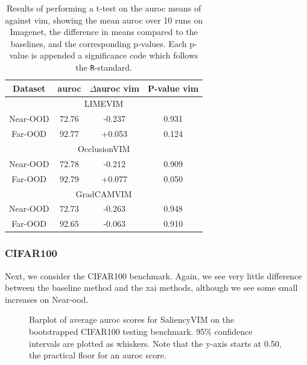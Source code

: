\documentclass[UKenglish]{uiomasterthesis} %
\theoremstyle{definition}
\begin{document}
\begin{table}[H]
\setlength\tabcolsep{3pt}
\begin{center}
\begin{tabular}{ |c|c|c|c| }
    \hline
    Dataset & \ac{auroc} & $\Delta$\ac{auroc} \ac{vim} & P-value \ac{vim} \\
    \hline
    \hline
    \multicolumn{4}{|c|}{LIMEVIM} \\
    \hline
    \rowcolor{near!50}
    Near-OOD & 72.76 & -0.237 & 0.931 \\
    \rowcolor{far!50}
    Far-OOD & 92.77 & +0.053 & 0.124 \\
    \hline
    \hline
    \multicolumn{4}{|c|}{OcclusionVIM} \\
    \hline
    \rowcolor{near!50}
    Near-OOD & 72.78 & -0.212 & 0.909 \\
    \rowcolor{far!50}
    Far-OOD & 92.79 & +0.077 & 0.050 \\
    \hline
    \hline
    \multicolumn{4}{|c|}{GradCAMVIM} \\
    \hline
    \rowcolor{near!50}
    Near-OOD & 72.73 & -0.263 & 0.948 \\
    \rowcolor{far!50}
    Far-OOD & 92.65 & -0.063 & 0.910 \\
    \hline
    \end{tabular}
    \caption[]{Results of performing a t-test on the \ac{auroc} means of against \ac{vim}, showing the mean \ac{auroc} over 10 runs on Imagenet, the difference in means compared to the baselines, and the corresponding p-values. Each p-value is appended a significance code which follows the \texttt{R}-standard.}
    \label{table:imagenet_salvim_ttest}
\end{center}
\setlength\tabcolsep{6pt}
\end{table}

\subsubsection{CIFAR100}

Next, we consider the CIFAR100 benchmark. Again, we see very little difference between the baseline method and the \ac{xai} methods, although we see some small increases on Near-\ac{ood}.

\begin{figure}[H]
    \begin{center}
        
    \end{center}
    \caption[CIFAR100 SaliencyVIM Bootstrap]{Barplot of average \ac{auroc} scores for SaliencyVIM on the bootstrapped CIFAR100 testing benchmark. 95\% confidence intervals are plotted as whiskers. Note that the y-axis starts at 0.50, the practical floor for an \ac{auroc} score.}
    \label{fig:cifar100_salvim_bootstrap_barplot}
\end{figure}
\end{document}
